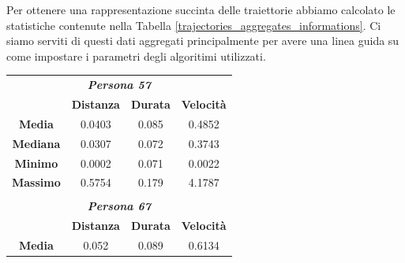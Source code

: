 \documentclass[12pt]{article}
\begin{document}
Per ottenere una rappresentazione succinta delle traiettorie abbiamo calcolato le statistiche contenute nella Tabella \ref{trajectories_aggregates_informations}.
Ci siamo serviti di questi dati aggregati principalmente per avere una linea guida su come impostare i parametri degli algoritimi utilizzati.

\begin{table}[!ht]
    \centering
    \begin{tabular}{cccc}
    \multicolumn{4}{c}{\textit{\textbf{Persona 57}}}                                                                                                                \\ \cline{2-4} 
    \multicolumn{1}{c|}{}                  & \multicolumn{1}{c|}{\textbf{Distanza}} & \multicolumn{1}{c|}{\textbf{Durata}} & \multicolumn{1}{c|}{\textbf{Velocità}} \\ \hline
    \multicolumn{1}{|c|}{\textbf{Media}}   & \multicolumn{1}{c|}{0.0403}            & \multicolumn{1}{c|}{0.085}           & \multicolumn{1}{c|}{0.4852}            \\ \hline
    \multicolumn{1}{|c|}{\textbf{Mediana}} & \multicolumn{1}{c|}{0.0307}            & \multicolumn{1}{c|}{0.072}           & \multicolumn{1}{c|}{0.3743}            \\ \hline
    \multicolumn{1}{|c|}{\textbf{Minimo}}  & \multicolumn{1}{c|}{0.0002}            & \multicolumn{1}{c|}{0.071}           & \multicolumn{1}{c|}{0.0022}            \\ \hline
    \multicolumn{1}{|c|}{\textbf{Massimo}} & \multicolumn{1}{c|}{0.5754}            & \multicolumn{1}{c|}{0.179}           & \multicolumn{1}{c|}{4.1787}            \\ \hline
                                           &                                        &                                      &                                        \\
    \multicolumn{4}{c}{\textit{\textbf{Persona 67}}}                                                                                                                \\ \cline{2-4} 
    \multicolumn{1}{c|}{}                  & \multicolumn{1}{c|}{\textbf{Distanza}} & \multicolumn{1}{c|}{\textbf{Durata}} & \multicolumn{1}{c|}{\textbf{Velocità}} \\ \hline
    \multicolumn{1}{|c|}{\textbf{Media}}   & \multicolumn{1}{c|}{0.052}             & \multicolumn{1}{c|}{0.089}           & \multicolumn{1}{c|}{0.6134}            \\ \hline

\end{tabular}
\end{table}
\end{document}
